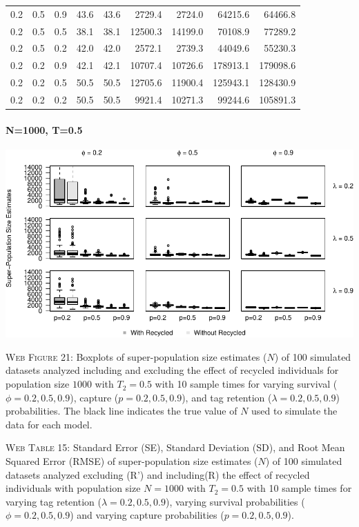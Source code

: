 \documentclass[]{article}
\let\oldparagraph\paragraph
\renewcommand{\paragraph}[1]{\oldparagraph{#1}\mbox{}}
\begin{document}
\begin{table}[ht]
{\begin{tabular}{rrrrrrrrr}
  0.2 & 0.5 & 0.9 & 43.6 & 43.6 & 2729.4 & 2724.0 & 64215.6 & 64466.8 \\ 
  0.2 & 0.5 & 0.5 & 38.1 & 38.1 & 12500.3 & 14199.0 & 70108.9 & 77289.2 \\ 
  0.2 & 0.5 & 0.2 & 42.0 & 42.0 & 2572.1 & 2739.3 & 44049.6 & 55230.3 \\ 
  0.2 & 0.2 & 0.9 & 42.1 & 42.1 & 10707.4 & 10726.6 & 178913.1 & 179098.6 \\ 
  0.2 & 0.2 & 0.5 & 50.5 & 50.5 & 12705.6 & 11900.4 & 125943.1 & 128430.9 \\ 
  0.2 & 0.2 & 0.2 & 50.5 & 50.5 & 9921.4 & 10271.3 & 99244.6 & 105891.3 \\ 
   \hline
\end{tabular}
}
\endgroup
\end{table}

\newpage

\paragraph{N=1000, T=0.5}\label{n1000-t0.5-3}

\includegraphics{Appendix_BW_files/figure-latex/figure21_superN_GJSTL4-1.pdf}

\textsc{Web Figure 21:} Boxplots of super-population size estimates
(\(N\)) of 100 simulated datasets analyzed including and excluding the effect
of recycled individuals for population size \(1000\) with \(T_2=0.5\)
with 10 sample times for varying survival (\(\phi=0.2,0.5,0.9\)),
capture (\(p=0.2,0.5,0.9\)), and tag retention (\(\lambda=0.2,0.5,0.9\))
probabilities. The black line indicates the true value of \(N\) used to
simulate the data for each model.

\textsc{Web Table 15:} Standard Error (SE), Standard Deviation (SD), and
Root Mean Squared Error (RMSE) of super-population size estimates
(\(N\)) of 100 simulated datasets analyzed excluding (R') and including(R) the
effect of recycled individuals with population size \(N=1000\) with
\(T_2=0.5\) with 10 sample times for varying tag retention
(\(\lambda=0.2,0.5,0.9\)), varying survival probabilities
(\(\phi=0.2,0.5,0.9\)) and varying capture probabilities
(\(p=0.2,0.5,0.9\)).
\end{document}

